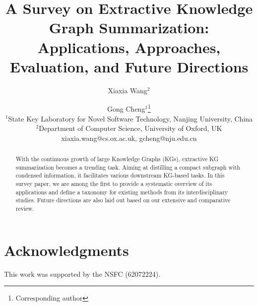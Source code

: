 \documentclass{article}
\title{A Survey on Extractive Knowledge Graph Summarization:\\Applications, Approaches, Evaluation, and Future Directions}
\author{
Xiaxia Wang$^2$
\and
Gong Cheng$^1$\thanks{Corresponding author}\\
\affiliations
$^1$State Key Laboratory for Novel Software Technology, Nanjing University, China\\
$^2$Department of Computer Science, University of Oxford, UK\\
\emails
xiaxia.wang@cs.ox.ac.uk,
gcheng@nju.edu.cn
}
\begin{document}
\maketitle

\begin{abstract}
With the continuous growth of large Knowledge Graphs (KGs), extractive KG summarization becomes a trending task. Aiming at distilling a compact subgraph with condensed information, it facilitates various downstream KG-based tasks. In this survey paper, we are among the first to provide a systematic overview of its applications and define a taxonomy for existing methods from its interdisciplinary studies. Future directions are also laid out based on our extensive and comparative review.
\end{abstract}









\clearpage

\section*{Acknowledgments}
This work was supported by the NSFC (62072224).



\end{document}
